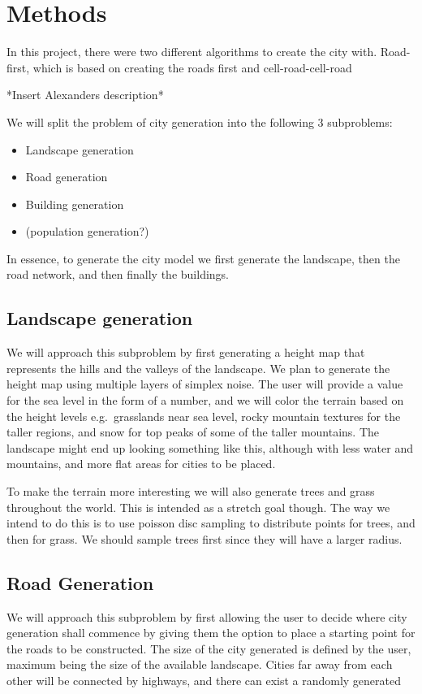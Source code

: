 \section{Methods}
In this project, there were two different algorithms to create the city with.
Road-first, which is based on creating the roads first and cell-road-cell-road 

*Insert Alexanders description* 

We will split the problem of city generation into the following 3 subproblems:
\begin{itemize}
  \item Landscape generation
  \item Road generation
  \item Building generation
  \item (population generation?)
\end{itemize}

In essence, to generate the city model we first generate the landscape, then the road network, and then finally the buildings. 

\subsection{Landscape generation}
We will approach this subproblem by first generating a height map that represents the hills and the valleys of the landscape.
We plan to generate the height map using multiple layers of simplex noise.
The user will provide a value for the sea level in the form of a number, and we will color the terrain based on the height levels e.g.\ grasslands near sea level, rocky mountain textures for the taller regions, and snow for top peaks of some of the taller mountains.
The landscape might end up looking something like this, although with less water and mountains, and more flat areas for cities to be placed.

To make the terrain more interesting we will also generate trees and grass throughout the world.
This is intended as a stretch goal though.
The way we intend to do this is to use poisson disc sampling to distribute points for trees, and then for grass. %
We should sample trees first since they will have a larger radius.

\subsection{Road Generation}
We will approach this subproblem by first allowing the user to decide where city generation shall commence by giving them the option to place a starting point for the roads to be constructed.
The size of the city generated is defined by the user, maximum being the size of the available landscape.
Cities far away from each other will be connected by highways, and there can exist a randomly generated 


